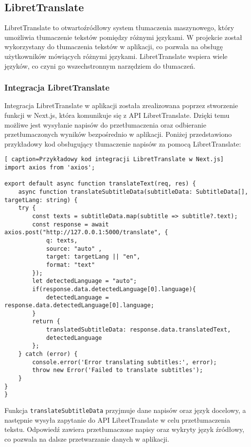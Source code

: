 \subsection{LibretTranslate}
LibretTranslate to otwartoźródłowy system tłumaczenia maszynowego, który umożliwia tłumaczenie tekstów pomiędzy różnymi językami. W projekcie został wykorzystany do tłumaczenia tekstów w aplikacji, co pozwala na obsługę użytkowników mówiących różnymi językami. LibretTranslate wspiera wiele języków, co czyni go wszechstronnym narzędziem do tłumaczeń.

\subsubsection{Integracja LibretTranslate}
Integracja LibretTranslate w aplikacji została zrealizowana poprzez stworzenie funkcji w Next.js, która komunikuje się z API LibretTranslate. Dzięki temu możliwe jest wysyłanie napisów do przetłumaczenia oraz odbieranie przetłumaczonych wyników bezpośrednio w aplikacji. Poniżej przedstawiono przykładowy kod obsługujący tłumaczenie napisów za pomocą LibretTranslate:

\begin{lstlisting}[ caption=Przykładowy kod integracji LibretTranslate w Next.js]
import axios from 'axios';

export default async function translateText(req, res) {
    async function translateSubtitleData(subtitleData: SubtitleData[], targetLang: string) {
    try {
        const texts = subtitleData.map(subtitle => subtitle?.text);
        const response = await axios.post("http://127.0.0.1:5000/translate", {
            q: texts,
            source: "auto" ,
            target: targetLang || "en",
            format: "text"
        });
        let detectedLanguage = "auto";
        if(response.data.detectedLanguage[0].language){
            detectedLanguage = response.data.detectedLanguage[0].language;
        }
        return {
            translatedSubtitleData: response.data.translatedText,
            detectedLanguage
        };
    } catch (error) {
        console.error('Error translating subtitles:', error);
        throw new Error('Failed to translate subtitles');
    }
}
}
\end{lstlisting}

Funkcja \texttt{translateSubtitleData} przyjmuje dane napisów oraz język docelowy, a następnie wysyła zapytanie do API LibretTranslate w celu przetłumaczenia tekstu. Odpowiedź zawiera przetłumaczone napisy oraz wykryty język źródłowy, co pozwala na dalsze przetwarzanie danych w aplikacji.